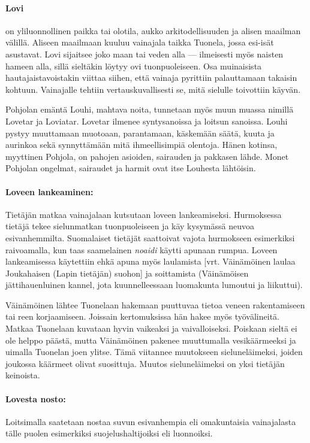   \paragraph{Lovi} on yliluonnollinen paikka tai olotila, aukko arkitodellisuuden ja alisen
    maailman välillä. Aliseen maailmaan kuuluu vainajala taikka Tuonela, jossa esi-isät asustavat.
    Lovi sijaitsee joko maan tai veden alla --- ilmeisesti myös naisten hameen alla, sillä
    sieltäkin löytyy ovi tuonpuoleiseen. Osa muinaisista hautajaistavoistakin viittaa siihen, että
    vainaja pyrittiin palauttamaan takaisin kohtuun. Vainajalle tehtiin vertauskuvallisesti se,
    mitä sielulle toivottiin käyvän. \par
    Pohjolan emäntä Louhi, mahtava noita, tunnetaan myös muun muassa nimillä Lovetar ja Loviatar.
    Lovetar ilmenee syntysanoissa ja loitsun sanoissa. Louhi pystyy muuttamaan muotoaan,
    parantamaan, käskemään säätä, kuuta ja aurinkoa sekä synnyttämään mitä ihmeellisimpiä olentoja.
    Hänen kotinsa, myyttinen Pohjola, on pahojen asioiden, sairauden ja pakkasen lähde. Monet
    Pohjolan ongelmat, sairaudet ja harmit ovat itse Louhesta lähtöisin.
  \paragraph{Loveen lankeaminen:} Tietäjän matkaa vainajalaan kutsutaan loveen lankeamiseksi.
    Hurmoksessa tietäjä tekee sielunmatkan tuonpuolei\-seen ja käy kysymässä neuvoa esivanhemmilta.
    Suomalaiset tietäjät saattoivat vajota hurmokseen esimerkiksi raivoamalla, kun taas saamelainen
    \emph{noaidi} käytti apunaan rumpua. Loveen lankeamisessa käytettiin ehkä apuna myös laulamista
    [vrt. Väinämöinen laulaa Joukahaisen (Lapin tietäjän) suohon] ja soittamista (Väinämöisen
    jättihauenluinen kannel, jota kuunnelleessaan luomakunta lumoutui ja liikuttui). \par
    Väinämöinen lähtee Tuonelaan hakemaan puuttuvaa tietoa veneen rakentamiseen tai reen
    korjaamiseen. Joissain kertomuksissa hän hakee myös työvälineitä. Matkaa Tuonelaan
    kuvataan hyvin vaikeaksi ja vaivalloiseksi. Poiskaan sieltä ei ole helppo päästä, mutta
    Väinämöinen pakenee muuttumalla vesikäärmeeksi ja uimalla Tuonelan joen ylitse. Tämä
    viitannee muutokseen sieluneläimeksi, joiden joukossa käärmeet olivat suosittuja. Muutos
    sieluneläimeksi on yksi tietäjän keinoista.
  \paragraph{Lovesta nosto:} Loitsimalla saatetaan nostaa suvun esivanhempia eli omakuntaisia
    vainajalasta tälle puolen esimerkiksi suojelushaltijoiksi eli luonnoiksi.
